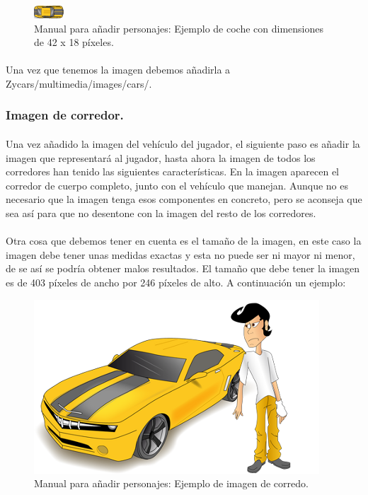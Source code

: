 \begin{figure}[H]
  \label{ejemplo_coche}
  \begin{center}
    \includegraphics[scale=1]{imagenes/ejemplo_coche.png}
  \end{center}
  \caption{Manual para añadir personajes: Ejemplo de coche con dimensiones de 42 x 18 píxeles.}
\end{figure}

\paragraph{}
Una vez que tenemos la imagen debemos añadirla a Zycars/multimedia/images/cars/.

\subsubsection{Imagen de corredor.}

\paragraph{}
Una vez añadido la imagen del vehículo del jugador, el siguiente paso es añadir la imagen que representará al jugador, hasta ahora 
la imagen de todos los corredores han tenido las siguientes características. En la imagen aparecen el corredor de cuerpo completo, 
junto con el vehículo que manejan. Aunque no es necesario que la imagen tenga esos componentes en concreto, pero se aconseja que sea
así para que no desentone con la imagen del resto de los corredores.

\paragraph{}
Otra cosa que debemos tener en cuenta es el tamaño de la imagen, en este caso la imagen debe tener unas medidas exactas y esta no
puede ser ni mayor ni menor, de se así se podría obtener malos resultados. El tamaño que debe tener la imagen es de 403 píxeles de
ancho por 246 píxeles de alto. A continuación un ejemplo:

\begin{figure}[H]
  \label{ejemplo_personaje}
  \begin{center}
    \includegraphics[scale=0.5]{imagenes/ejemplo_personaje.png}
  \end{center}
  \caption{Manual para añadir personajes: Ejemplo de imagen de corredo.}
\end{figure}


